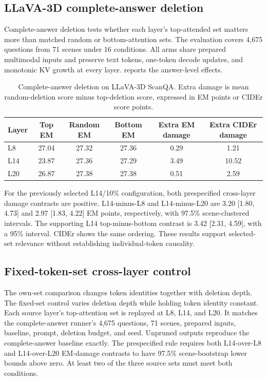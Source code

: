 \subsection{LLaVA-3D complete-answer deletion}
Complete-answer deletion tests whether each layer's top-attended set matters more than matched random or bottom-attention sets. The evaluation covers 4,675 questions from 71 scenes under 16 conditions. All arms share prepared multimodal inputs and preserve text tokens, one-token decode updates, and monotonic KV growth at every layer.  reports the answer-level effects.

\begin{table}[t]
\centering
\small
\caption{Complete-answer deletion on LLaVA-3D ScanQA. Extra damage is mean random-deletion score minus top-deletion score, expressed in EM points or CIDEr score points.}
\label{tab:supp_generation}
\begin{tabular}{lccccc}
\toprule
Layer & Top EM & Random EM & Bottom EM & Extra EM damage & Extra CIDEr damage \\
\midrule
L8 & 27.04 & 27.32 & 27.36 & 0.29 & 1.21 \\
L14 & 23.87 & 27.36 & 27.29 & 3.49 & 10.52 \\
L20 & 26.87 & 27.38 & 27.38 & 0.51 & 2.59 \\
\bottomrule
\end{tabular}
\end{table}

For the previously selected L14/10\% configuration, both prespecified cross-layer damage contrasts are positive. L14-minus-L8 and L14-minus-L20 are 3.20 [1.80, 4.73] and 2.97 [1.83, 4.22] EM points, respectively, with 97.5\% scene-clustered intervals. The supporting L14 top-minus-bottom contrast is 3.42 [2.31, 4.59], with a 95\% interval. CIDEr shows the same ordering. These results support selected-set relevance without establishing individual-token causality.

\subsection{Fixed-token-set cross-layer control}
\label{sec:supp_fixed_control}
The own-set comparison changes token identities together with deletion depth. The fixed-set control varies deletion depth while holding token identity constant. Each source layer's top-attention set is replayed at L8, L14, and L20. It matches the complete-answer runner's 4,675 questions, 71 scenes, prepared inputs, baseline, prompt, deletion budget, and seed. Unpruned outputs reproduce the complete-answer baseline exactly. The prespecified rule requires both L14-over-L8 and L14-over-L20 EM-damage contrasts to have 97.5\% scene-bootstrap lower bounds above zero. At least two of the three source sets must meet both conditions.

